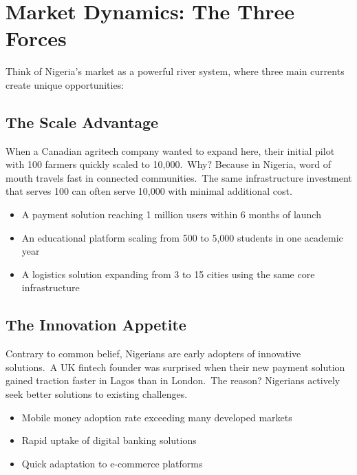 \section{Market Dynamics: The Three Forces}\label{sec:market-dynamics:-the-three-forces}

Think of Nigeria's market as a powerful river system, where three main currents create unique opportunities:

\subsection{The Scale Advantage}\label{subsec:the-scale-advantage}
When a Canadian agritech company wanted to expand here, their initial pilot with 100 farmers quickly scaled to 10,000.\ Why?
Because in Nigeria, word of mouth travels fast in connected communities.\ The same infrastructure investment that serves 100 can often serve 10,000 with minimal additional cost.

\begin{tcolorbox}[colback=white,colframe=primarydark,title=\textbf{Scale Impact Examples}]
\begin{itemize}
    \item A payment solution reaching 1 million users within 6 months of launch
    \item An educational platform scaling from 500 to 5,000 students in one academic year
    \item A logistics solution expanding from 3 to 15 cities using the same core infrastructure
\end{itemize}
\end{tcolorbox}

\subsection{The Innovation Appetite}\label{subsec:the-innovation-appetite}
Contrary to common belief, Nigerians are early adopters of innovative solutions.\ A UK fintech founder was surprised when their new payment solution gained traction faster in Lagos than in London.\ The reason?
Nigerians actively seek better solutions to existing challenges.

\begin{tcolorbox}[colback=white,colframe=primary,title=\textbf{Innovation Adoption Examples}]
\begin{itemize}
    \item Mobile money adoption rate exceeding many developed markets
    \item Rapid uptake of digital banking solutions
    \item Quick adaptation to e-commerce platforms
\end{itemize}
\end{tcolorbox}

